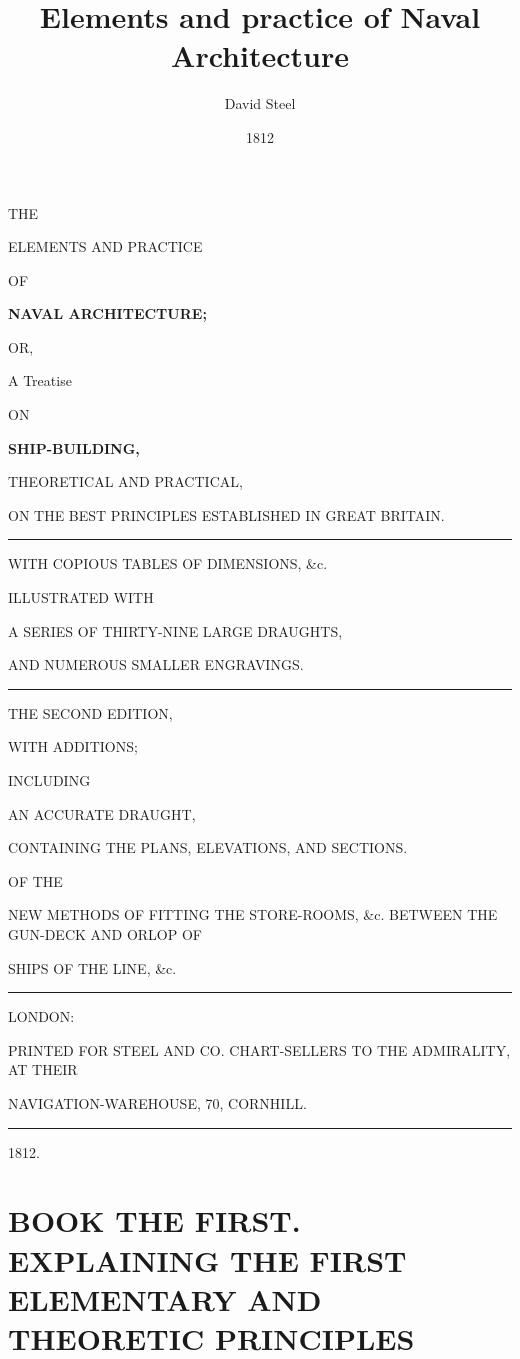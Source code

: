 \documentclass[12pt,twoside,a4paper]{book}
\begin{document}
	
\title{Elements and practice of Naval Architecture}
\author{David Steel}
\date{1812}

\begin{titlepage}
\doublespacing
\begin{center}

\footnotesize THE

\LARGE ELEMENTS AND PRACTICE

\tiny OF

\Huge \textbf{NAVAL ARCHITECTURE;}

\tiny OR,

\LARGE A Treatise

\tiny ON

\huge \textbf{SHIP-BUILDING,}

\small THEORETICAL AND PRACTICAL,

\large ON THE BEST PRINCIPLES ESTABLISHED IN GREAT BRITAIN.

\rule{4cm}{2pt}

\normalsize WITH COPIOUS TABLES OF DIMENSIONS, \&c.

\small ILLUSTRATED WITH

\large A SERIES OF THIRTY-NINE LARGE DRAUGHTS,

\small AND NUMEROUS SMALLER ENGRAVINGS.

\rule{4cm}{2pt}

\small THE SECOND EDITION,

\footnotesize WITH ADDITIONS;

\tiny INCLUDING 

\large AN ACCURATE DRAUGHT,

\footnotesize CONTAINING THE PLANS, ELEVATIONS, AND SECTIONS.

\tiny OF THE

\singlespacing
\small NEW METHODS OF FITTING THE STORE-ROOMS, \&c. BETWEEN THE GUN-DECK AND ORLOP OF 

SHIPS OF THE LINE, \&c.

\rule{8cm}{1pt}

\footnotesize LONDON:

\scriptsize PRINTED FOR STEEL AND CO. CHART-SELLERS TO THE ADMIRALITY, AT THEIR

\scriptsize NAVIGATION-WAREHOUSE, 70, CORNHILL.

\rule{3cm}{1pt}

\large 1812.
	\end{center}
\end{titlepage}
\restoregeometry

\part{BOOK THE FIRST. \\
\footnotesize EXPLAINING THE FIRST ELEMENTARY AND THEORETIC PRINCIPLES}
\setlength{\parindent}{10pt}

\end{document}
